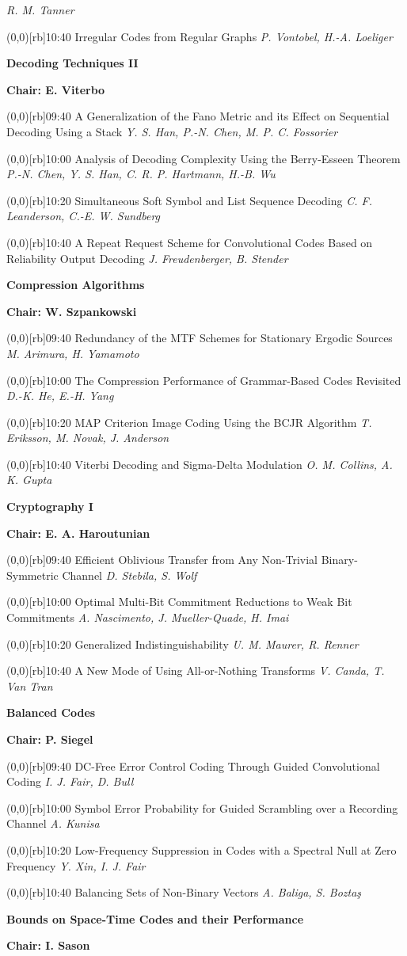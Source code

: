 \documentclass[a5paper,twoside]{article}
\def\sesstitle#1{\vspace{.45\bigskipamount}\par{\bfseries #1}\par}
\def\sesschair#1{{\bfseries Chair: #1}\par\vspace{.65\medskipamount}}
\def\papertime#1{\makebox(0,0)[rb]{{\scriptsize #1}\hspace{.5em}}}
\def\papertitle#1{#1\hfil\break}
\def\paperauthors#1{{\itshape #1}\par\filbreak\vspace{.65\medskipamount}}
\begin{document}
\paperauthors{R. M. Tanner}
\papertime{10:40}%
\papertitle{Irregular Codes from Regular Graphs}
\paperauthors{P. Vontobel, H.-A. Loeliger}
\sesstitle{Decoding Techniques II}
\sesschair{E. Viterbo}
\papertime{09:40}%
\papertitle{A Generalization of the Fano Metric and its Effect on Sequential Decoding Using a Stack}
\paperauthors{Y. S. Han, P.-N. Chen, M. P. C. Fossorier}
\papertime{10:00}%
\papertitle{Analysis of Decoding Complexity Using the Berry-Esseen Theorem}
\paperauthors{P.-N. Chen, Y. S. Han, C. R. P. Hartmann, H.-B. Wu}
\papertime{10:20}%
\papertitle{Simultaneous Soft Symbol and List Sequence Decoding}
\paperauthors{C. F. Leanderson, C.-E. W. Sundberg}
\papertime{10:40}%
\papertitle{A Repeat Request Scheme for Convolutional Codes Based on Reliability Output Decoding}
\paperauthors{J. Freudenberger, B. Stender}
\sesstitle{Compression Algorithms}
\sesschair{W. Szpankowski}
\papertime{09:40}%
\papertitle{Redundancy of the MTF Schemes for Stationary Ergodic Sources}
\paperauthors{M. Arimura, H. Yamamoto}
\papertime{10:00}%
\papertitle{The Compression Performance of Grammar-Based Codes Revisited}
\paperauthors{D.-K. He, E.-H. Yang}
\papertime{10:20}%
\papertitle{MAP Criterion Image Coding Using the BCJR Algorithm}
\paperauthors{T. Eriksson, M. Novak, J. Anderson}
\papertime{10:40}%
\papertitle{Viterbi Decoding and Sigma-Delta Modulation}
\paperauthors{O. M. Collins, A. K. Gupta}
\sesstitle{Cryptography I}
\sesschair{E. A. Haroutunian}
\papertime{09:40}%
\papertitle{Efficient Oblivious Transfer from Any Non-Trivial Binary-Symmetric Channel}
\paperauthors{D. Stebila, S. Wolf}
\papertime{10:00}%
\papertitle{Optimal Multi-Bit Commitment Reductions to Weak Bit Commitments}
\paperauthors{A. Nascimento, J. Mueller-Quade, H. Imai}
\papertime{10:20}%
\papertitle{Generalized Indistinguishability}
\paperauthors{U. M. Maurer, R. Renner}
\papertime{10:40}%
\papertitle{A New Mode of Using All-or-Nothing Transforms}
\paperauthors{V. Canda, T. Van Tran}
\sesstitle{Balanced Codes}
\sesschair{P. Siegel}
\papertime{09:40}%
\papertitle{DC-Free Error Control Coding Through Guided Convolutional Coding}
\paperauthors{I. J. Fair, D. Bull}
\papertime{10:00}%
\papertitle{Symbol Error Probability for Guided Scrambling over a Recording Channel}
\paperauthors{A. Kunisa}
\papertime{10:20}%
\papertitle{Low-Frequency Suppression in Codes with a Spectral Null at Zero Frequency}
\paperauthors{Y. Xin, I. J. Fair}
\papertime{10:40}%
\papertitle{Balancing Sets of Non-Binary Vectors}
\paperauthors{A. Baliga, S. Bozta\c{s}}
\sesstitle{Bounds on Space-Time Codes and their Performance}
\sesschair{I. Sason}
\end{document}
